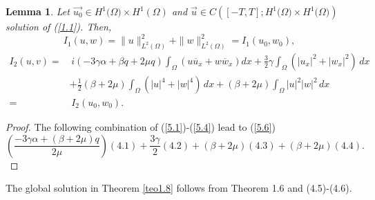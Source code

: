 \documentclass[reqno]{amsart}
\newtheorem{lemma}{Lemma}[section]
\numberwithin{equation}{section}
\begin{document}
\begin{lemma}
Let $\overrightarrow{u_0}\in H^{1}(\Omega\mathbb{)}\times
H^{1}\left( \Omega\right)  $ and $\overrightarrow{u}\in C\left(
[-T,T];H^{1}(\Omega \mathbb{)\times}H^{1}(\Omega\mathbb{)}\right)  $
solution of (\ref{1.1}).
Then,
\begin{equation}\label{5.5}
I_{1}(u,w)=\| u\| _{L^{2}\left(  \Omega\right)  }^{2}+\| w\| _{L^{2}\left(  \Omega\right)  }^{2}
=I_{1}(u_{0},w_{0}),
\end{equation}
\begin{equation}\label{5.6}
\begin{split}
I_{2}(u,v) =&\,i\left( -3\gamma\alpha\!+\!\beta q\!+\!2\mu q\right)
\int_{\Omega}(u\overline{u}_{x}+w\overline{w}_{x})dx
+\frac{3}{2}\gamma\int_{\Omega}(|u_{x}|^2+|w_{x}|^2)\,dx \\
&  +\frac{1}{2}\left(  \beta+2\mu\right) \int_{\Omega}(|u|^4+|w|^4)\,dx
+\left(\beta+2\mu\right) \int _{\Omega}|u|^2| w|^2\,dx\\
 =&\, I_{2}(u_0,w_0).
\end{split}
\end{equation}

\end{lemma}

\begin{proof}
The following combination of
(\ref{5.1})-(\ref{5.4}) lead to (\ref{5.6})
\[
\left(  \frac{-3\gamma\alpha+(\beta+2\mu)q}{2\mu}\right)
(4.1)+\frac{3\gamma }{2}(4.2)+\left(  \beta+2\mu\right)
(4.3)+\left( \beta+2\mu\right)
(4.4)\text{.}\]
\end{proof}
The global solution in Theorem \ref{teo1.8} follows from Theorem
1.6 and (4.5)-(4.6).
\end{document}
